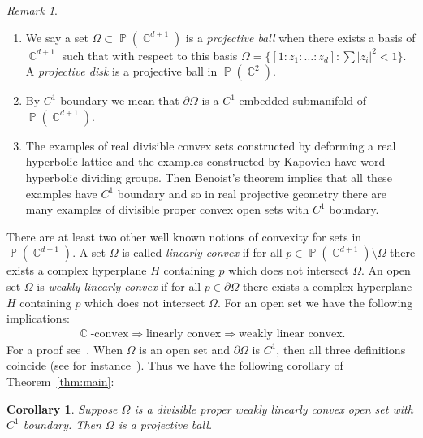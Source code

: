 \documentclass[12pt]{amsart}
\theoremstyle{plain}
\newtheorem{corollary}[proposition]{Corollary}
\theoremstyle{definition}
\theoremstyle{remark}
\newtheorem{remark}[proposition]{Remark}
\begin{document}
\begin{remark} \
\begin{enumerate}
\item We say a set $\Omega \subset \operatorname{\mathbb{P}}(\operatorname{\mathbb{C}}^{d+1})$ is a \emph{projective ball} when there exists a basis of $\operatorname{\mathbb{C}}^{d+1}$ such that with respect to this basis $\Omega = \{ [1:z_1:\dots : z_d] : \sum {\left|{z_i}\right|}^2 <1 \}$. A \emph{projective disk} is a projective ball in $\operatorname{\mathbb{P}}(\operatorname{\mathbb{C}}^{2})$.
\item By $C^1$ boundary we mean that $\partial \Omega$ is a $C^1$ embedded submanifold of $\operatorname{\mathbb{P}}(\operatorname{\mathbb{C}}^{d+1})$.
\item The examples of real divisible convex sets constructed by deforming a real hyperbolic lattice and the examples constructed by Kapovich have word hyperbolic dividing groups. Then Benoist's theorem  implies that all these examples have $C^1$ boundary and so in real projective geometry there are many examples of divisible proper convex open sets with $C^1$ boundary.
\end{enumerate}
 \end{remark}

There are at least two other well known notions of convexity for sets in $\operatorname{\mathbb{P}}(\operatorname{\mathbb{C}}^{d+1})$. A set $\Omega$ is called \emph{linearly convex} if for all $p \in \operatorname{\mathbb{P}}(\operatorname{\mathbb{C}}^{d+1})\setminus \Omega$ there exists a complex hyperplane $H$ containing $p$ which does not intersect $\Omega$. An open set $\Omega$ is \emph{weakly linearly convex} if for all $p \in \partial \Omega$ there exists a complex hyperplane $H$ containing $p$ which does not intersect $\Omega$.  For an open set we have the following implications:
\begin{align*}
\operatorname{\mathbb{C}}\text{-convex} \Rightarrow \text{linearly convex} \Rightarrow \text{weakly linear convex.}
\end{align*}
For a proof see~\cite[Theorem 3.29]{APS2004}. When $\Omega$ is an open set and $\partial \Omega$ is $C^1$, then all three definitions coincide (see for instance~\cite[Corollary 2.5.6]{APS2004}). Thus we have the following corollary of Theorem~\ref{thm:main}:

\begin{corollary}
Suppose $\Omega$ is a divisible proper weakly linearly convex open set with $C^1$ boundary. Then $\Omega$ is a projective ball.
\end{corollary}
\end{document}
